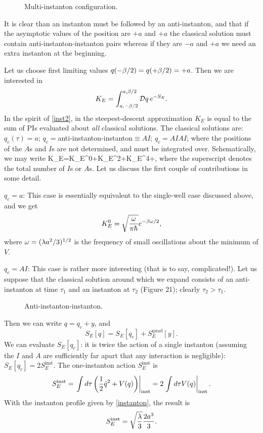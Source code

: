 \documentclass[12pt]{article}
\begin{document}
\begin{figure}[ht]
\epsfysize=5cm
\centerline{}
\caption{Multi-instanton configuration.}
\end{figure}


It is clear than an instanton must be followed by an anti-instanton,
and that if the asymptotic values of the position are $+a$ and $+a$
the classical solution must contain anti-instanton-instanton pairs
whereas if they are $-a$ and $+a$ we need an extra instanton at the
beginning.

Let us choose first limiting values $q(-{\beta}/2)=q(+{\beta}/2)=+a$. Then we
are interested in
\[
K_E=\int_{a,-\be/2}^{a,\be/2}\DD q\,e^{-S_E}.
\]
In the spirit of \eqref{inst2}, in the steepest-descent approximation
$K_E$ is equal to the sum of PIs evaluated about
{\em all} classical solutions. The classical solutions are:
$q_c(\tau)=a$;
$q_c=$anti-instanton-instanton$\equiv AI$; $q_c=AIAI$; \etcc where the
positions of the $A$s and $I$s are not determined, and must be
integrated over. Schematically, we may write
\beq
K_E=K_E^0+K_E^2+K_E^4+\cdots,
\label{new3}
\eeq
where the superscript denotes the
total number of $I$s or $A$s. Let us discuss the first couple of
contributions in some detail.

\noindent $q_c=a$: This case is essentially equivalent to the
single-well case discussed above, and we get
\[
K_E^0=\sqrt{{\omega}\over\pi\hbar}e^{-{\beta}{\omega}/2},
\]
where ${\omega}=(\lambda a^2/3)^{1/2}$ is the frequency of small oscillations
about the minimum of $V$.

\noindent $q_c=AI$: This case is rather more interesting (that is to
say, complicated!). Let us suppose that the classical solution around
which we expand consists of an anti-instanton at time $\tau_1$ and an
instanton at $\tau_2$ (Figure 21); clearly $\tau_2>\tau_1$.

\begin{figure}[ht]
\epsfysize=5cm
\centerline{}
\caption{Anti-instanton-instanton.}
\end{figure}


Then we can write $q=q_c+y$, and
\[
S_E[q]=S_E[q_c]+S_E^{\mathrm{quad}}[y].
\]
We can evaluate $S_E[q_c]$: it is twice the action of a single
instanton (assuming the $I$ and $A$ are sufficiently far apart that any
interaction is negligible): $S_E[q_c]=2S_E^{\mathrm{inst}}$. The
one-instanton action $S_E^{\mathrm{inst}}$ is
\[
S_E^{\mathrm{inst}}
=\left.\int d\tau\left({\frac 12}{\dot q}^2+V(q)\right)
\right|_{\mathrm{inst}}=2\left.
\int d\tau V(q)\right|_{\mathrm{inst}}.
\]
With the instanton profile given by \eqref{instanton}, the result is
\[
S_E^{\mathrm{inst}}=\sqrt{\lambda\over3}{2a^3\over3}.
\]
\end{document}
